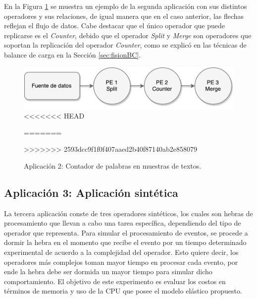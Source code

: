 En la Figura \ref{fig:segundaAplicacion} se muestra un ejemplo de la segunda aplicaci\'on con sus distintos operadores y sus relaciones, de igual manera que en el caso anterior, las flechas reflejan el flujo de datos. Cabe destacar que el \'unico operador que puede replicarse es el \textit{Counter}, debido que el operador \textit{Split} y \textit{Merge} son operadores que soportan la replicaci\'on del operador \textit{Counter}, como se explic\'o en las t\'ecnicas de balance de carga en la Secci\'on \ref{sec:fisionBC}.

\begin{figure}[!ht]
	\centering
	\captionsetup{justification=centering}
		\includegraphics[scale=0.6]{images/App2.pdf}
<<<<<<< HEAD
	\caption[Aplicación 2: Contador de palabras en muestras de textos.]{Aplicación 2: Contador de palabras en muestras de textos.\\Fuente: Elaboración propia.}
=======
	\caption{Aplicaci\'on 2: Contador de palabras en muestras de textos.}
>>>>>>> 2593dcc9f1f0f407aaed2b40f87140ab2e858079
	\label{fig:segundaAplicacion}
\end{figure}

\subsection{Aplicaci\'on 3: Aplicaci\'on sint\'etica}

La tercera aplicaci\'on conste de tres operadores sint\'eticos, los cuales son hebras de procesamiento que llevan a cabo una tarea espec\'ifica, dependiendo del tipo de operador que representa. Para simular el procesamiento de eventos, se procede a dormir la hebra en el momento que recibe el evento por un tiempo determinado experimental de acuerdo a la complejidad del operador. Esto quiere decir, los operadores m\'as complejos toman mayor tiempo en procesar cada evento, por ende la hebra debe ser dormida un mayor tiempo para simular dicho comportamiento. El objetivo de este experimento es evaluar los costos en t\'erminos de memoria y uso de la CPU que posee el modelo el\'astico propuesto.

